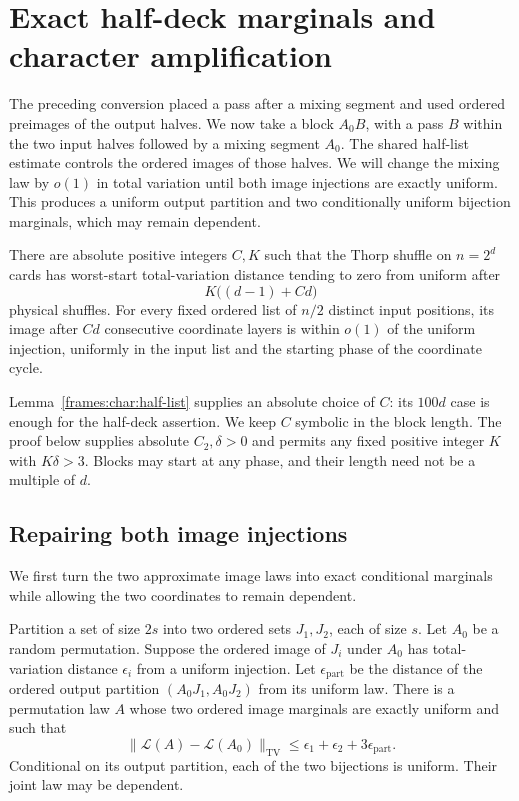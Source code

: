 \section{Exact half-deck marginals and character amplification}
\label{sec:character}

The preceding conversion placed a pass after a mixing segment and used
ordered preimages of the output halves. We now take a block $A_0B$,
with a pass $B$ within the two input halves followed by a mixing segment
$A_0$. The shared half-list estimate controls the ordered images of
those halves. We will change the mixing law by $o(1)$ in total variation
until both image injections are exactly uniform. This produces a uniform
output partition and two conditionally uniform bijection marginals,
which may remain dependent.

\begin{theorem}
\label{char:main}
There are absolute positive integers $C,K$ such that the Thorp shuffle
on $n=2^d$ cards has worst-start total-variation distance tending to zero
from uniform after
\[
 K\bigl((d-1)+Cd\bigr)
\]
physical shuffles. For every fixed ordered list of $n/2$ distinct input
positions, its image after $Cd$ consecutive coordinate layers is within
$o(1)$ of the uniform injection, uniformly in the input list and the
starting phase of the coordinate cycle.
\end{theorem}

Lemma~\ref{frames:char:half-list} supplies an absolute choice of $C$:
its $100d$ case is enough for the half-deck assertion. We keep $C$
symbolic in the block length. The proof below supplies absolute
$C_2,\delta>0$ and permits any fixed positive integer $K$ with
$K\delta>3$. Blocks may start at any phase, and their length need not
be a multiple of $d$.

\subsection{Repairing both image injections}
\label{char:jointrepair}

We first turn the two approximate image laws into exact conditional
marginals while allowing the two coordinates to remain dependent.

\begin{lemma}\label{char:repair}
Partition a set of size $2s$ into two ordered sets $J_1,J_2$, each of
size $s$. Let $A_0$ be a random permutation. Suppose the ordered image
of $J_i$ under $A_0$ has total-variation distance $\epsilon_i$ from a
uniform injection. Let $\epsilon_{\mathrm{part}}$ be the distance of
the ordered output partition $(A_0J_1,A_0J_2)$ from its uniform law.
There is a permutation law $A$ whose two ordered image marginals are
exactly uniform and such that
\begin{equation}\label{char:repaircost}
 \|\mathcal L(A)-\mathcal L(A_0)\|_{\mathrm{TV}}
 \le\epsilon_1+\epsilon_2+3\epsilon_{\mathrm{part}}.
\end{equation}
Conditional on its output partition, each of the two bijections is
uniform. Their joint law may be dependent.
\end{lemma}

